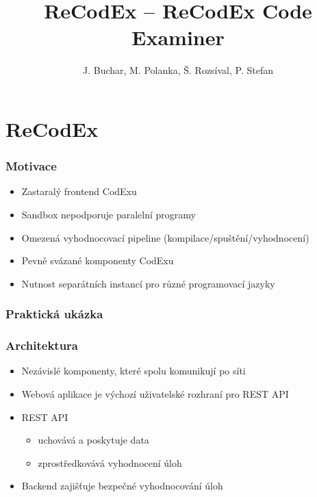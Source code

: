 \documentclass{beamer}
\begin{document}

\title[ReCodEx -- ReCodEx Code Examiner] %
{ReCodEx -- ReCodEx Code Examiner}
\author[Buchar, Polanka, Rozsíval, Stefan]{J. Buchar, M. Polanka, Š. Rozsíval, P. Stefan}
\date[3. 12. 2016]{} %
\subject{Computer Science}

\frame{\titlepage}

\section{ReCodEx}

\begin{frame}
	\frametitle{Motivace}
	\begin{itemize}
		\item Zastaralý frontend CodExu
		\item Sandbox nepodporuje paralelní programy
		\item Omezená vyhodnocovací pipeline (kompilace/spuštění/vyhodnocení)
		\item Pevně svázané komponenty CodExu
		\item Nutnost separátních instancí pro různé programovací jazyky
	\end{itemize}
\end{frame}

\begin{frame}
	\frametitle{Praktická ukázka}
\end{frame}

\begin{frame}
	\frametitle{Architektura}
	\begin{itemize}
		\item Nezávislé komponenty, které spolu komunikují po síti
		\item Webová aplikace je výchozí uživatelské rozhraní pro REST API
		\item REST API 
			\begin{itemize}
				\item uchovává a poskytuje data
				\item zprostředkovává vyhodnocení úloh
			\end{itemize}
		\item Backend zajišťuje bezpečné vyhodnocování úloh
	\end{itemize}
\end{frame}
\end{document}
